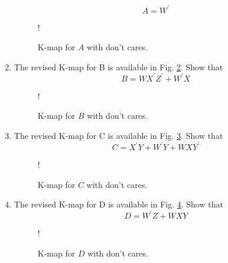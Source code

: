 \documentclass[journal,12pt,twocolumn]{IEEEtran}
\begin{document}
\begin{enumerate}[1.]
\begin{equation}
	A = {W}^{\prime}
\end{equation}
\begin{figure}[!h]
	\resizebox {\columnwidth} {!} {
		
	}
	\caption{K-map for $A$ with don't cares.}
	\label{fig:kmap_A_x}
\end{figure}
%
\item  The revised K-map for B is available in Fig. \ref{fig:kmap_B_x}.  Show that 
%
\begin{equation}
	B = WX^{\prime}Z^{\prime} + W^{\prime}X
\end{equation}
\begin{figure}[!h]
	\resizebox {\columnwidth} {!} {
		
	}
	\caption{K-map for $B$ with don't cares.}
	\label{fig:kmap_B_x}
\end{figure}
%
\item  The revised K-map for C is available in Fig. \ref{fig:kmap_C_x}.  Show that 
%
\begin{equation}
	C = {X}^{\prime}{Y} + {W}^{\prime}{Y} + {W}{X}{Y}^{\prime}
\end{equation}
\begin{figure}[!h]
	\resizebox {\columnwidth} {!} {
		
	}
	\caption{K-map for $C$ with don't cares.}
	\label{fig:kmap_C_x}
\end{figure}
%
\item  The revised K-map for D is available in Fig. \ref{fig:kmap_D_x}.  Show that 
%
\begin{equation}
	D  = {W}^{\prime}{Z} + {W}{X}{Y}
\end{equation}
\begin{figure}[!h]
	\resizebox {\columnwidth} {!} {
		
	}
	\caption{K-map for $D$ with don't cares.}
	\label{fig:kmap_D_x}
\end{figure}


\end{enumerate}
\end{document}

